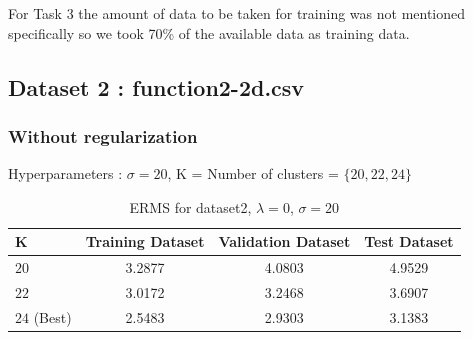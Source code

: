 \documentclass[11pt]{article}
\begin{document}
For Task 3 the amount of data to be taken for training was not mentioned specifically so we took 70\% of the available data as training data.
\subsection{Dataset 2 : function2-2d.csv}
\subsubsection{Without regularization}
Hyperparameters : $\sigma = 20 $, K = Number of clusters = $\{20,22,24\}$

\begin{table}[h]
\label{tab:tab3.1.1}
\begin{center}
\begin{tabular}{|l|c|c|c|}
\hline
\textbf{K } & \textbf{Training Dataset}&\textbf{Validation Dataset} & \textbf{Test Dataset} \\
\hline
$20$ & 3.2877 & 4.0803 & 4.9529\\
\hline
$22 $ & 3.0172 & 3.2468 & 3.6907\\
\hline
$24$ (Best) & 2.5483 & 2.9303 & 3.1383\\
\hline
\end{tabular}
\caption{ERMS for dataset2, $\lambda = 0$, $\sigma = 20$}
\end{center}
\end{table}
\end{document}
